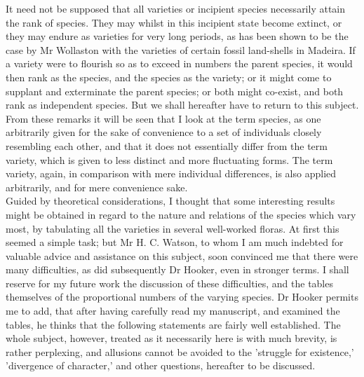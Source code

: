 \indent It need not be supposed that all varieties or incipient species necessarily attain the rank of species. They may whilst in this incipient state become extinct, or they may endure as varieties for very long periods, as has been shown to be the case by Mr Wollaston with the varieties of certain fossil land-shells in Madeira. If a variety were to flourish so as to exceed in numbers the parent species, it would then rank as the species, and the species as the variety; or it might come to supplant and exterminate the parent species; or both might co-exist, and both rank as independent species. But we shall hereafter have to return to this subject. \\
\indent From these remarks it will be seen that I look at the term species, as one arbitrarily given for the sake of convenience to a set of individuals closely resembling each other, and that it does not essentially differ from the term variety, which is given to less distinct and more fluctuating forms. The term variety, again, in comparison with mere individual differences, is also applied arbitrarily, and for mere convenience sake. \\
\indent Guided by theoretical considerations, I thought that some interesting results might be obtained in regard to the nature and relations of the species which vary most, by tabulating all the varieties in several well-worked floras.  At first this seemed a simple task; but Mr H. C. Watson, to whom I am much indebted for valuable advice and assistance on this subject, soon convinced me that there were many difficulties, as did subsequently Dr Hooker, even in stronger terms. I shall reserve for my future work the discussion of these difficulties, and the tables themselves of the proportional numbers of the varying species. Dr Hooker permits me to add, that after having carefully read my manuscript, and examined the tables, he thinks that the following statements are fairly well established. The whole subject, however, treated as it necessarily here is with much brevity, is rather perplexing, and allusions cannot be avoided to the 'struggle for existence,' 'divergence of character,' and other questions, hereafter to be discussed. \\
